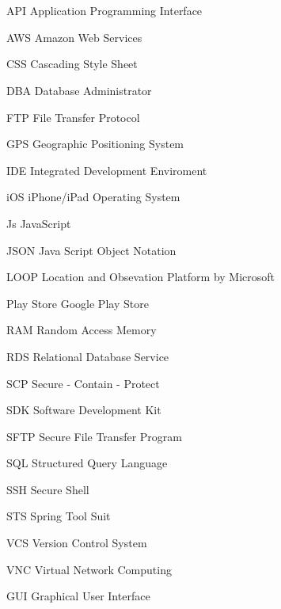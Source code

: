 \newpage
\chapter*{\abbreviationName}
\vspace{-0.3em}


\begin{abbrv}
\item[API]					Application Programming Interface
\item[AWS]					Amazon Web Services
\item[CSS]					Cascading Style Sheet
\item[DBA]					Database Administrator
\item[FTP]					File Transfer Protocol
\item[GPS]					Geographic Positioning System
\item[IDE]					Integrated Development Enviroment
\item[iOS]					iPhone/iPad Operating System
\item[Js]					JavaScript
\item[JSON]					Java Script Object Notation
\item[LOOP]					Location and Obsevation Platform by Microsoft
\item[Play Store]			Google Play Store
\item[RAM]				    Random Access Memory
\item[RDS]				    Relational Database Service
\item[SCP]                  Secure - Contain - Protect
\item[SDK]                  Software Development Kit
\item[SFTP]                 Secure File Transfer Program
\item[SQL]                  Structured Query Language
\item[SSH]                  Secure Shell
\item[STS]                  Spring Tool Suit
\item[VCS]					Version Control System
\item[VNC]					Virtual Network Computing
\item[GUI]					Graphical User Interface
\end{abbrv}